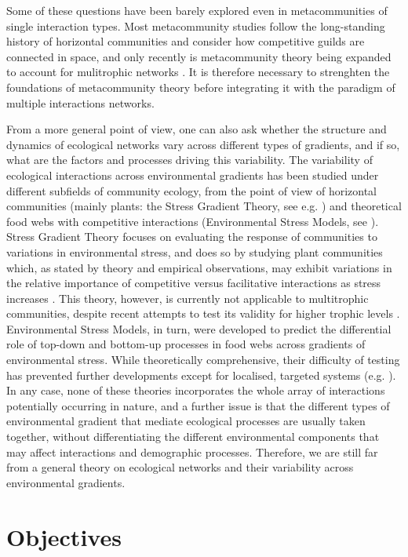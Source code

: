 Some of these questions have been barely explored even in metacommunities of single interaction types. Most metacommunity studies follow the long-standing history of horizontal communities and consider how competitive guilds are connected in space, and only recently is metacommunity theory being expanded to account for mulitrophic networks \citep{McCann2005, Fahimipour2014, Gravel2016a}. It is therefore necessary to strenghten the foundations of metacommunity theory before integrating it with the paradigm of multiple interactions networks.

From a more general point of view, one can also ask whether the structure and dynamics of ecological networks vary across different types of gradients, and if so, what are the factors and processes driving this variability. The variability of ecological interactions across environmental gradients has been studied under different subfields of community ecology, from the point of view of horizontal communities (mainly plants: the Stress Gradient Theory, see e.g. \citealt{Maestre2009}) and theoretical food webs with competitive interactions (Environmental Stress Models, see \citealt{Menge1987}). Stress Gradient Theory focuses on evaluating the response of communities to variations in environmental stress, and does so by studying plant communities which, as stated by theory and empirical observations, may exhibit variations in the relative importance of competitive versus facilitative interactions as stress increases \citep{Callaway1997}. This theory, however, is currently not applicable to multitrophic communities, despite recent attempts to test its validity for higher trophic levels \citep{Barrio2013}. Environmental Stress Models, in turn, were developed to predict the differential role of top-down and bottom-up processes in food webs across gradients of environmental stress. While theoretically comprehensive, their difficulty of testing has prevented further developments except for localised, targeted systems (e.g. \citealt{Cheng2016a, Daleo2015}). In any case, none of these theories incorporates the whole array of interactions potentially occurring in nature, and a further issue is that the different types of environmental gradient that mediate ecological processes are usually taken together, without differentiating the different environmental components that may affect interactions and demographic processes. Therefore, we are still far from a general theory on ecological networks and their variability across environmental gradients.

\section{Objectives}

